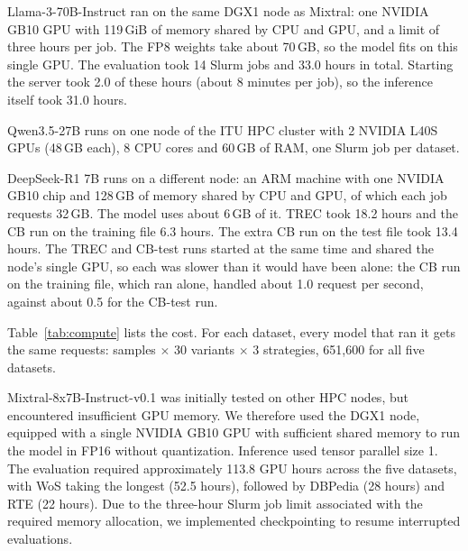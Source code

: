 \par\medskip

Llama-3-70B-Instruct ran on the same DGX1 node as Mixtral: one NVIDIA GB10
GPU with 119\,GiB of memory shared by CPU and GPU, and a limit of three hours per job. The FP8 weights take about 70\,GB, so the model fits on this single GPU. The evaluation took 14 Slurm jobs and 33.0 hours in total. Starting the server took 2.0 of these hours (about 8 minutes per job), so the inference itself took 31.0 hours.

\par\medskip

Qwen3.5-27B runs on one node of the ITU HPC cluster with 2 NVIDIA L40S GPUs
(48\,GB each), 8 CPU cores and 60\,GB of RAM, one Slurm job per dataset.

\par\medskip

DeepSeek-R1 7B runs on a different node: an ARM machine with one NVIDIA GB10
chip and 128\,GB of memory shared by CPU and GPU, of which each job requests
32\,GB. The model uses about 6\,GB of it. TREC took 18.2 hours and the CB run
on the training file 6.3 hours. The extra CB run on the test file took 13.4
hours. The TREC and CB-test runs started at the same time and shared the
node's single GPU, so each was slower than it would have been alone: the CB
run on the training file, which ran alone, handled about 1.0 request per
second, against about 0.5 for the CB-test run.

\par\medskip

 Table~\ref{tab:compute}
lists the cost. For each dataset, every model that ran it gets the same
requests: samples $\times$ 30 variants $\times$ 3 strategies, 651{,}600 for
all five datasets. 

\par\medskip

Mixtral-8x7B-Instruct-v0.1 was initially tested on
other HPC nodes, but encountered insufficient GPU
memory. We therefore used the DGX1 node, equipped
with a single NVIDIA GB10 GPU with sufficient shared
memory to run the model in FP16 without quantization.
Inference used tensor parallel size 1. The evaluation
required approximately 113.8 GPU hours across the
five datasets, with WoS taking the longest (52.5 hours),
followed by DBPedia (28 hours) and RTE (22 hours).
Due to the three-hour Slurm job limit associated
with the required memory allocation, we implemented
checkpointing to resume interrupted evaluations.

